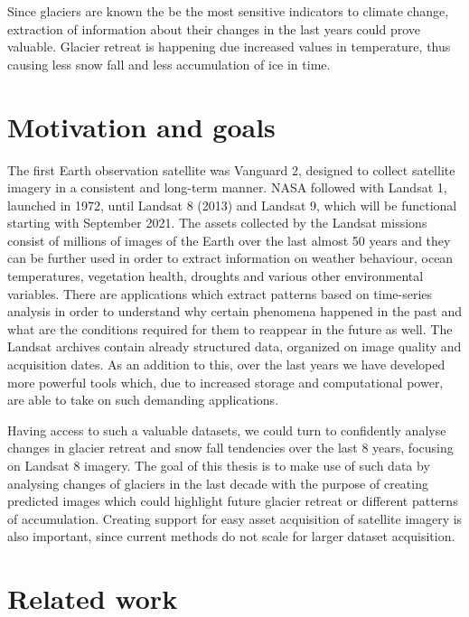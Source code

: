 \documentclass[12pt, a4paper]{report}
\begin{document}
	\par Since glaciers are known the be the most sensitive indicators to climate change, extraction of information about their changes in the last years could prove valuable. Glacier retreat is happening due increased values in temperature, thus causing less snow fall and less accumulation of ice in time.
	
	\section{Motivation and goals}
	
	\par The first Earth observation satellite was Vanguard 2, designed to collect satellite imagery in a consistent and long-term manner. NASA followed with Landsat 1, launched in 1972, until Landsat 8 (2013) and Landsat 9, which will be functional starting with September 2021. The assets collected by the Landsat missions consist of millions of images of the Earth over the last almost 50 years and they can be further used in order to extract information on weather behaviour, ocean temperatures, vegetation health, droughts and various other environmental variables. There are applications which extract patterns based on time-series analysis in order to understand why certain phenomena happened in the past and what are the conditions required for them to reappear in the future as well. The Landsat archives contain already structured data, organized on image quality and acquisition dates. As an addition to this, over the last years we have developed more powerful tools which, due to increased storage and computational power, are able to take on such demanding applications.

	\par Having access to such a valuable datasets, we could turn to confidently analyse changes in glacier retreat and snow fall tendencies over the last 8 years, focusing on Landsat 8 imagery.  The goal of this thesis is to make use of such data by analysing changes of glaciers in the last decade with the purpose of creating predicted images which could highlight future glacier retreat or different patterns of accumulation. Creating support for easy asset acquisition of satellite imagery is also important, since current methods do not scale for larger dataset acquisition. 

	\section{Related work}
	
\end{document}
